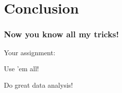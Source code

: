 \documentclass[10pt, xcolor=x11names, compress]{beamer}
\begin{document}
\section{Conclusion}

\begin{frame}
  \frametitle{Now you know all my tricks!}
  \LARGE
  \begin{block}{\LARGE Your assignment:}
    \begin{center}
      Use 'em all!

      \bigskip

      Do great data analysis!
    \end{center}
  \end{block}
\end{frame}

\end{document}
